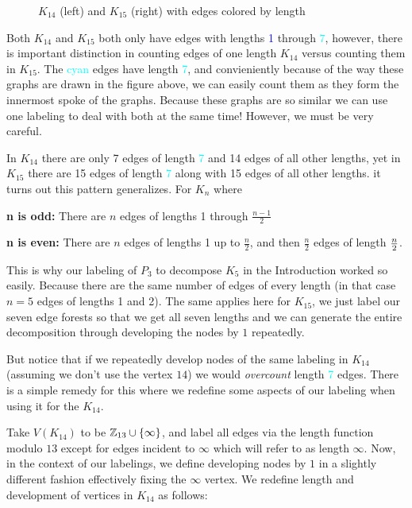 \begin{figure}[H]
\begin{center}
\begin{tikzpicture}[scale=2]
            
    \end{tikzpicture}
    \end{center}
\caption{$K_{14}$ (left) and $K_{15}$ (right) with edges colored by length}
\label{fig:K14K15colored}
\end{figure}

Both $K_{14}$ and $K_{15}$ both only have edges with lengths \textcolor{blue}{1} through \textcolor{cyan}{7}, however, there is important distinction in counting edges of one length $K_{14}$ versus counting them in $K_{15}$. The \textcolor{cyan}{cyan} edges have length \textcolor{cyan}{7}, and convieniently because of the way these graphs are drawn in the figure above, we can easily count them as they form the innermost spoke of the graphs. Because these graphs are so similar we can use one labeling to deal with both at the same time! However, we must be very careful.

In $K_{14}$ there are only 7 edges of length \textcolor{cyan}{7} and 14 edges of all other lengths, yet in $K_{15}$ there are 15 edges of length \textcolor{cyan}{7} along with 15 edges of all other lengths. it turns out this pattern generalizes. For $K_{n}$ where\newline

\textbf{n is odd:} There are $n$ edges of lengths 1 through $\frac{n-1}{2}$

\textbf{n is even:} There are $n$ edges of lengths 1 up to $\frac{n}{2}$, and then $\frac{n}{2}$ edges of length $\frac{n}{2}\newline$.

This is why our labeling of $P_{3}$ to decompose $K_{5}$ in the Introduction worked so easily. Because there are the same number of edges of every length (in that case $n=5$ edges of lengths 1 and 2). The same applies here for $K_{15}$, we just label our seven edge forests so that we get all seven lengths and we can generate the entire decomposition through developing the nodes by $1$ repeatedly. 

But notice that if we repeatedly develop nodes of the same labeling in $K_{14}$ (assuming we don't use the vertex $14$) we would \textit{overcount} length \textcolor{cyan}{7} edges. There is a simple remedy for this where we redefine some aspects of our labeling when using it for the $K_{14}$.

Take $V(K_{14})$ to be $\ZZ_{13}\cup \{\infty\}$, and label all edges via the length function modulo $13$ except for edges incident to $\infty$ which will refer to as length $\infty$. Now, in the context of our labelings, we define developing nodes by $1$ in a slightly different fashion effectively fixing the $\infty$ vertex. We redefine length and development of vertices in $K_{14}$ as follows:

